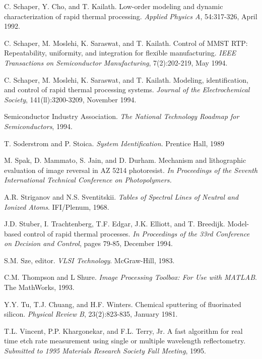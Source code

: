 \begin{thebibliography}{100}
	 C. Schaper, Y. Cho, and T. Kailath. Low-order modeling and dynamic characterization of rapid thermal processing. \emph{Applied Physics A}, 54:317-326, April 1992.
	
	 C. Schaper, M. Moslehi, K. Saraswat, and T. Kailath. Control of MMST RTP: Repeatability, uniformity, and integration for flexible manufacturing. \emph{IEEE Transactions on Semiconductor Manufacturing}, 7(2):202-219, May 1994.

	
	 C. Schaper, M. Moslehi, K. Saraswat, and T. Kailath. Modeling, identification, and control of rapid thermal processing systems. \emph{Journal of the Electrochemical Society}, 141(ll):3200-3209, November 1994.
	
	 Semiconductor Industry Association. \emph{The National Technology Roadmap for Semiconductors}, 1994.
	
	 T. Soderstrom and P. Stoica. \emph{System Identification}. Prentice Hall, 1989
	
	 M. Spak, D. Mammato, S. Jain, and D. Durham. Mechanism and lithographic evaluation of image reversal in AZ 5214 photoresist. \emph{In Proceedings of the Seventh International Technical Conference on Photopolymers.}
	
	 A.R. Striganov and N.S. Sventitskii. \emph{Tables of Spectral Lines of Neutral and Ionized Atoms}. IFI/Plenum, 1968.

	
	 J.D. Stuber, I. Trachtenberg, T.F. Edgar, J.K. Elliott, and T. Breedijk. Model-based control of rapid thermal processes. \emph{In Proceedings of the 33rd Conference on Decision and Control}, pages 79-85, December 1994.

	
	 S.M. Sze, editor. \emph{VLSI Technology}. McGraw-Hill, 1983.
	
	 C.M. Thompson and L Shure. \emph{Image Processing Toolbox: For Use with MATLAB}. The MathWorks, 1993.

	
	 Y.Y. Tu, T.J. Chuang, and H.F. Winters. Chemical sputtering of fluorinated silicon. \emph{Physical Review B}, 23(2):823-835, January 1981.
	
	 T.L. Vincent, P.P. Khargonekar, and F.L. Terry, Jr. A fast algorithm for real time etch rate measurement using single or multiple wavelength reflectometry. \emph{Submitted to 1995 Materials Research Society Fall Meeting}, 1995.
	

\end{thebibliography}
